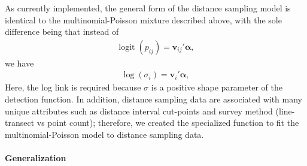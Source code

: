 \documentclass[article,shortnames]{jss}
\DeclareMathOperator{\logit}{logit}
\begin{document}
As currently implemented, the general form of the distance sampling model
is identical to the multinomial-Poisson mixture described above, with the
sole difference being that instead of
\begin{gather}
  \logit(p_{ij}) = \mathbf v_{ij}' \mathbf \alpha,
\end{gather}
we have
\begin{gather}
  \log(\sigma_i) = \mathbf v_{i}' \mathbf \alpha,
\end{gather}
Here, the log link is required because $\sigma$ is a positive shape parameter
of the detection function. In addition, distance sampling data
are associated with many unique attributes such as distance interval
cut-points and survey method (line-transect vs point count); therefore,
we created the specialized function  to fit the
multinomial-Poisson model to distance sampling data.


\paragraph{Generalization}
\end{document}
